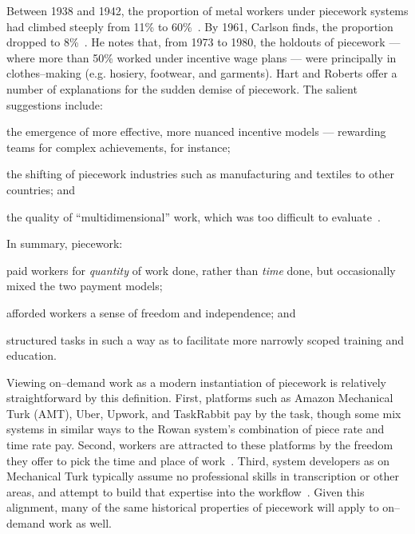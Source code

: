 \documentclass[pn4226]{subfiles}
\begin{document}
Between 1938 and 1942, the proportion of metal workers under piecework systems had climbed steeply from 11\% to 60\%~\cite{hart2005piecework}.
By 1961, Carlson finds, the proportion dropped to 8\%~\cite{carlson1982time}.
He notes that, from 1973 to 1980, the holdouts of piecework
--- where more than 50\% worked under incentive wage plans ---
were principally in clothes--making (e.g. hosiery, footwear, and garments).
Hart and Roberts offer a number of explanations for the sudden demise of piecework.
The salient suggestions include:
\begin{inlinelist}
\item the emergence of more effective, more nuanced incentive models
--- rewarding teams for complex achievements, for instance;
\item the shifting of piecework industries such as manufacturing and textiles to other countries; and
\item the quality of ``multidimensional'' work, which was too difficult to evaluate~\cite{hart2013rise}.
\end{inlinelist}



In summary, piecework:
\begin{inlinelist}
  \item paid workers for \textit{quantity} of work done, rather than \textit{time} done,
        but occasionally mixed the two payment models;
  \item afforded workers a sense of freedom and independence; and
  \item structured tasks in such a way as to facilitate more narrowly scoped training and education.
\end{inlinelist}

Viewing on--demand work as a modern instantiation of piecework is relatively straightforward by this definition.
First, platforms such as Amazon Mechanical Turk (AMT), Uber, Upwork, and TaskRabbit pay by the task, though some mix systems in similar ways to the Rowan system's combination of piece rate and time rate pay.
Second, workers are attracted to these platforms by the freedom they offer to pick the time and place of work~\cite{martin2014being,whyWouldAnyoneBrewer}.
Third, system developers as on Mechanical Turk typically assume no professional skills in transcription or other areas, and attempt to build that expertise into the workflow~\cite{noronha2011platemate,bernsteinSoylent}.
Given this alignment, many of the same historical properties of piecework will apply to on--demand work as well. 
\end{document}

